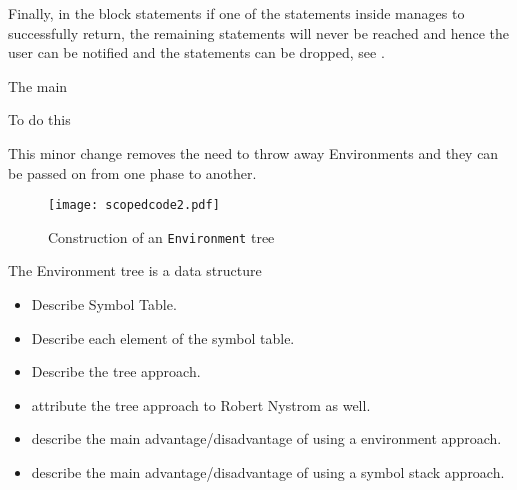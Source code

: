 Finally, in the block statements if one of the statements inside
manages to successfully return, the remaining statements will
never be reached and hence the user can be notified and the
statements can be dropped, see .

The main


To do this

This minor change removes the need to throw away Environments
and they can be passed on from one phase to another.

\begin{figure}[H]
\centering
\begin{mdframed}[backgroundcolor=UMPaleRed]
\texttt{[image: scopedcode2.pdf]}
\end{mdframed}
\caption{Construction of an \texttt{Environment} tree}
\label{fig:scopedcode2}
\end{figure}

The Environment tree is a data structure

\begin{itemize}
    \item Describe Symbol Table.
    \item Describe each element of the symbol table.
    \item Describe the tree approach.
    \item attribute the tree approach to Robert Nystrom as well.
    \item describe the main advantage/disadvantage of using a environment
        approach.
    \item describe the main advantage/disadvantage of using a symbol stack
        approach.
\end{itemize}
